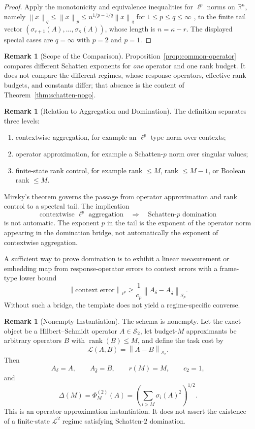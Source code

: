 \documentclass[12pt]{article}
\theoremstyle{definition}
\newtheorem{remark}[theorem]{Remark}
\DeclareMathOperator{\rank}{rank}
\newcommand{\norm}[1]{\left\lVert#1\right\rVert}
\newcommand{\Sp}[1]{\mathcal S_{#1}}
\begin{document}
\begin{proof}
Apply the monotonicity and equivalence inequalities for $\ell^p$ norms on
$\mathbb R^n$, namely $\norm{x}_q\le\norm{x}_p\le n^{1/p-1/q}\norm{x}_q$ for
$1\le p\le q\le\infty$ \cite[Ch.~2]{cover}, to the finite tail vector
$(\sigma_{r+1}(A),\dots,\sigma_\kappa(A))$, whose length is $n=\kappa-r$.  The
displayed special cases are $q=\infty$ with $p=2$ and $p=1$.
\end{proof}

\begin{remark}[Scope of the Comparison]
\label{rem:common-operator-scope}
Proposition~\ref{prop:common-operator} compares different Schatten exponents
for \emph{one} operator and one rank budget.  It does not compare the
different regimes, whose response operators, effective rank budgets, and
constants differ; that absence is the content of
Theorem~\ref{thm:schatten-nogo}.
\end{remark}

\begin{remark}[Relation to Aggregation and Domination]
\label{rem:response-what-supplies}
The definition separates three levels:
\begin{enumerate}[label=(\arabic*)]
\item contextwise aggregation, for example an $\ell^p$-type norm over
contexts;
\item operator approximation, for example a Schatten-$p$ norm over singular
values;
\item finite-state rank control, for example rank $\le M$, rank $\le M-1$,
or Boolean rank $\le M$.
\end{enumerate}
Mirsky's theorem governs the passage from operator approximation and rank
control to a spectral tail.  The implication
\[
\text{contextwise }\ell^p\text{ aggregation}
\quad\Longrightarrow\quad
\text{Schatten-}p\text{ domination}
\]
is not automatic.  The exponent $p$ in the tail is the exponent of the
operator norm appearing in the domination bridge, not automatically the
exponent of contextwise aggregation.

A sufficient way to prove domination is to exhibit a linear measurement or
embedding map from response-operator errors to context errors with a
frame-type lower bound
\[
\norm{\text{context error}}_{\ell^p}
\ge
\frac1{c_p}
\norm{A_\delta-A_{\widehat\delta}}_{\Sp p}.
\]
Without such a bridge, the template does not yield a regime-specific converse.
\end{remark}

\begin{remark}[Nonempty Instantiation]
\label{rem:frobenius-nonempty}
The schema is nonempty.  Let the exact object be a Hilbert--Schmidt operator
$A\in\mathcal S_2$, let budget-$M$ approximants be arbitrary operators $B$
with $\rank(B)\le M$, and define the task cost by
\[
\mathcal L(A,B)
=
\norm{A-B}_{\Sp 2}.
\]
Then
\[
A_\delta=A,
\qquad
A_{\widehat\delta}=B,
\qquad
r(M)=M,
\qquad
c_2=1,
\]
and
\[
\Delta(M)
=
\Phi^{(2)}_M(A)
=
\left(
\sum_{i>M}
\sigma_i(A)^2
\right)^{1/2}.
\]
This is an operator-approximation instantiation.  It does not assert the
existence of a finite-state $\mathcal L^2$ regime satisfying Schatten-$2$
domination.
\end{remark}
\end{document}
